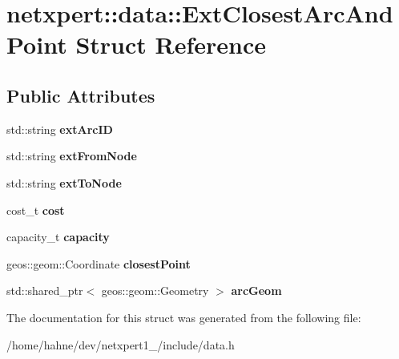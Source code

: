 \hypertarget{structnetxpert_1_1data_1_1ExtClosestArcAndPoint}{}\section{netxpert\+:\+:data\+:\+:Ext\+Closest\+Arc\+And\+Point Struct Reference}
\label{structnetxpert_1_1data_1_1ExtClosestArcAndPoint}
\subsection*{Public Attributes}
\begin{DoxyCompactItemize}
\item 
std\+::string {\bfseries ext\+Arc\+ID}\hypertarget{structnetxpert_1_1data_1_1ExtClosestArcAndPoint_a821aa8ee01fbd25c199e7f9fa770a44f}{}\label{structnetxpert_1_1data_1_1ExtClosestArcAndPoint_a821aa8ee01fbd25c199e7f9fa770a44f}

\item 
std\+::string {\bfseries ext\+From\+Node}\hypertarget{structnetxpert_1_1data_1_1ExtClosestArcAndPoint_abdaf7b5738f4ca5e710841d5ff7fd904}{}\label{structnetxpert_1_1data_1_1ExtClosestArcAndPoint_abdaf7b5738f4ca5e710841d5ff7fd904}

\item 
std\+::string {\bfseries ext\+To\+Node}\hypertarget{structnetxpert_1_1data_1_1ExtClosestArcAndPoint_aaf521441394e04cf1e18e91497c80691}{}\label{structnetxpert_1_1data_1_1ExtClosestArcAndPoint_aaf521441394e04cf1e18e91497c80691}

\item 
cost\+\_\+t {\bfseries cost}\hypertarget{structnetxpert_1_1data_1_1ExtClosestArcAndPoint_a0f5a880f5145e32f971512eaf9b5983b}{}\label{structnetxpert_1_1data_1_1ExtClosestArcAndPoint_a0f5a880f5145e32f971512eaf9b5983b}

\item 
capacity\+\_\+t {\bfseries capacity}\hypertarget{structnetxpert_1_1data_1_1ExtClosestArcAndPoint_a350fa54bc26af1bf561752df97cff106}{}\label{structnetxpert_1_1data_1_1ExtClosestArcAndPoint_a350fa54bc26af1bf561752df97cff106}

\item 
geos\+::geom\+::\+Coordinate {\bfseries closest\+Point}\hypertarget{structnetxpert_1_1data_1_1ExtClosestArcAndPoint_a9b5d95aa9e2194b622866d1c45316082}{}\label{structnetxpert_1_1data_1_1ExtClosestArcAndPoint_a9b5d95aa9e2194b622866d1c45316082}

\item 
std\+::shared\+\_\+ptr$<$ geos\+::geom\+::\+Geometry $>$ {\bfseries arc\+Geom}\hypertarget{structnetxpert_1_1data_1_1ExtClosestArcAndPoint_a294b37e5cb1c6e77380d163ecda306cd}{}\label{structnetxpert_1_1data_1_1ExtClosestArcAndPoint_a294b37e5cb1c6e77380d163ecda306cd}

\end{DoxyCompactItemize}


The documentation for this struct was generated from the following file\+:\begin{DoxyCompactItemize}
\item 
/home/hahne/dev/netxpert1\+\_/include/data.\+h\end{DoxyCompactItemize}
